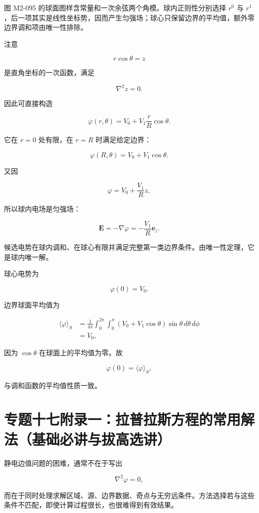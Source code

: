 图 M2-095 的球面图样含常量和一次余弦两个角模。球内正则性分别选择 \(r^0\)
与
\(r^1\)，后一项其实是线性坐标势，因而产生匀强场；球心只保留边界的平均值，额外零边界调和项由唯一性排除。

注意

\[
r\cos\theta=z
\]

是直角坐标的一次函数，满足

\[
\nabla^2z=0.
\]

因此可直接构造

\[
\boxed{
\varphi(r,\theta)
=V_0+V_1\frac rR\cos\theta
}.
\]

它在 \(r=0\) 处有限，在 \(r=R\) 时满足给定边界：

\[
\varphi(R,\theta)=V_0+V_1\cos\theta.
\]

又因

\[
\varphi=V_0+\frac{V_1}{R}z,
\]

所以球内电场是匀强场：

\[
\boxed{
\mathbf E
=-\nabla\varphi
=-\frac{V_1}{R}\mathbf e_z
}.
\]

候选电势在球内调和、在球心有限并满足完整第一类边界条件。由唯一性定理，它是球内唯一解。

球心电势为

\[
\varphi(0)=V_0.
\]

边界球面平均值为

\[
\begin{aligned}
\langle\varphi\rangle_S
&=\frac1{4\pi}
\int_0^{2\pi}\int_0^{\pi}
(V_0+V_1\cos\theta)
\sin\theta\,d\theta\,d\phi\\
&=V_0,
\end{aligned}
\]

因为 \(\cos\theta\) 在球面上的平均值为零。故

\[
\boxed{
\varphi(0)=\langle\varphi\rangle_S
},
\]

与调和函数的平均值性质一致。

\section{专题十七附录一：拉普拉斯方程的常用解法（基础必讲与拔高选讲）}\label{m2:ux4e13ux9898ux5341ux4e03ux9644ux5f55ux4e00ux62c9ux666eux62c9ux65afux65b9ux7a0bux7684ux5e38ux7528ux89e3ux6cd5ux57faux7840ux5fc5ux8bb2ux4e0eux62d4ux9ad8ux9009ux8bb2}

静电边值问题的困难，通常不在于写出

\[
\nabla^2\varphi=0,
\]

而在于同时处理求解区域、源、边界数据、奇点与无穷远条件。方法选择若与这些条件不匹配，即使计算过程很长，也很难得到有效结果。


